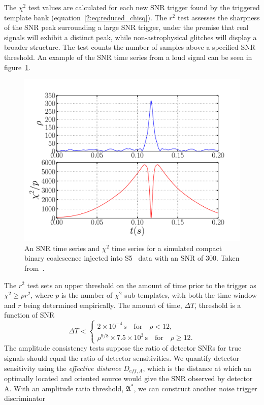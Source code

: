 The $\chi^{2}$ test values are calculated for each new SNR trigger found by the triggered template bank (equation~\ref{2:eq:reduced_chisq}). The \( r^{2} \) test assesses the sharpness of the SNR peak surrounding a large SNR trigger, under the premise that real \gwadj signals will exhibit a distinct peak, while non-astrophysical glitches will display a broader structure. The test counts the number of samples above a specified SNR threshold. An example of the SNR time series from a loud signal can be seen in figure~\ref{2:fig:ihope-snr-timeseries}.
%
\begin{figure}
    \centering
    \includegraphics[width=0.75\linewidth]{images/2_searches/ihope_snr_timeseries.pdf}
    \caption{An SNR time series and $\chi^{2}$ time series for a simulated compact binary coalescence injected into S5~\cite{S5:2012} data with an SNR of $300$. Taken from~\cite{IHOPE:2012zx}.}
    \label{2:fig:ihope-snr-timeseries}
\end{figure}
%
The \( r^{2} \) test sets an upper threshold on the amount of time prior to the trigger as \(\chi^{2} \ge p r^{2}\), where \( p \) is the number of \(\chi^{2}\) sub-templates, with both the time window and \( r \) being determined empirically. The amount of time, $\Delta T$, threshold is a function of SNR
%
\begin{equation}
    \Delta T < 
    \begin{cases}
        2 \times 10^{-4} \, \text{s} \quad \text{for} \quad \rho < 12, \\
        \rho^{9/8} \times 7.5 \times 10^{3} \, \text{s} \quad \text{for} \quad \rho \ge 12.
    \end{cases}
\end{equation}
%
The amplitude consistency tests suppose the ratio of detector SNRs for true \gwadj signals should equal the ratio of detector sensitivities. We quantify detector sensitivity using the \textit{effective distance} $D_{eff, A}$, which is the distance at which an optimally located and oriented source would give the SNR observed by detector A. With an amplitude ratio threshold, $\mathfrak{A}^{*}$, we can construct another noise trigger discriminator
